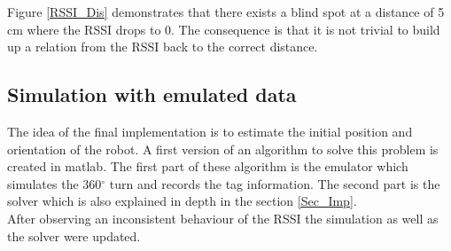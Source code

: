 Figure \ref{RSSI_Dis} demonstrates that there exists a blind spot at a distance of 5 cm where the RSSI drops to 0. The consequence is that it is not trivial to build up a relation from the RSSI back to the correct distance. \\

\subsection{Simulation with emulated data}
The idea of the final implementation is to estimate the initial position and orientation of the robot. A first version of an algorithm to solve this problem is created in matlab. The first part of these algorithm is the emulator which simulates the 360$^\circ$ turn and records the tag information. The second part is the solver which is also explained in depth in the section \ref{Sec_Imp}. \\
After observing an inconsistent behaviour of the RSSI the simulation as well as the solver were updated.\\

